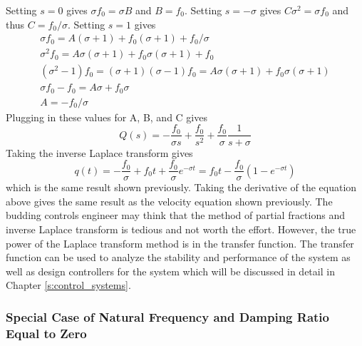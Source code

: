Setting $s=0$ gives $\sigma f_0 = \sigma B$ and $B = f_0$. Setting $s=-\sigma$ gives $C \sigma^2=\sigma f_0$ and thus $C=f_0/\sigma$. Setting $s=1$ gives 
\begin{equation}
    \begin{matrix}
        \sigma f_0 = A(\sigma+1)+f_0(\sigma+1)+f_0/\sigma \\
        \sigma^2 f_0 = A\sigma(\sigma+1)+f_0\sigma(\sigma+1)+f_0 \\
        (\sigma^2 - 1) f_0 = (\sigma+1)(\sigma-1)f_0 = A\sigma(\sigma+1) +f_0\sigma(\sigma+1)\\
        \sigma f_0 - f_0 = A \sigma + f_0 \sigma \\
        A = -f_0/\sigma
    \end{matrix}
\end{equation}
Plugging in these values for A, B, and C gives        
\begin{equation}
    Q(s) = -\frac{f_0}{\sigma s} + \frac{f_0}{s^2} + \frac{f_0}{\sigma}\frac{1}{s+\sigma}
\end{equation}
Taking the inverse Laplace transform gives
\begin{equation}
    q(t) = -\frac{f_0}{\sigma} + f_0 t + \frac{f_0}{\sigma} e^{-\sigma t} = f_0 t - \frac{f_0}{\sigma}(1 - e^{-\sigma t})
\end{equation}
which is the same result shown previously. Taking the derivative of the equation above gives the same result as the velocity equation shown previously. The budding controls engineer may think that the method of partial fractions and inverse Laplace transform is tedious and not worth the effort. However, the true power of the Laplace transform method is in the transfer function. The transfer function can be used to analyze the stability and performance of the system as well as design controllers for the system which will be discussed in detail in Chapter \ref{s:control_systems}.

\subsubsection{Special Case of Natural Frequency and Damping Ratio Equal to Zero}

